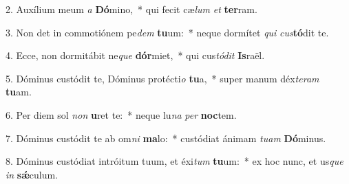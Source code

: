2. Auxílium meum \textit{a} \textbf{Dó}mino,~*  qui fecit cæ\textit{lum} \textit{et} \textbf{ter}ram.\

3. Non det in commotiónem pe\textit{dem} \textbf{tu}um:~*  neque dormítet \textit{qui} \textit{cus}\textbf{tó}dit te.\

4. Ecce, non dormitábit ne\textit{que} \textbf{dór}miet,~*  qui cus\textit{tó}\textit{dit} \textbf{Is}raël.\

5. Dóminus custódit te, Dóminus protécti\textit{o} \textbf{tu}a,~*  super manum déx\textit{te}\textit{ram} \textbf{tu}am.\

6. Per diem sol \textit{non} \textbf{u}ret te:~*  neque lu\textit{na} \textit{per} \textbf{noc}tem.\

7. Dóminus custódit te ab om\textit{ni} \textbf{ma}lo:~*  custódiat ánimam \textit{tu}\textit{am} \textbf{Dó}minus.\

8. Dóminus custódiat intróitum tuum, et éxi\textit{tum} \textbf{tu}um:~*  ex hoc nunc, et us\textit{que} \textit{in} \textbf{sǽ}culum.\

